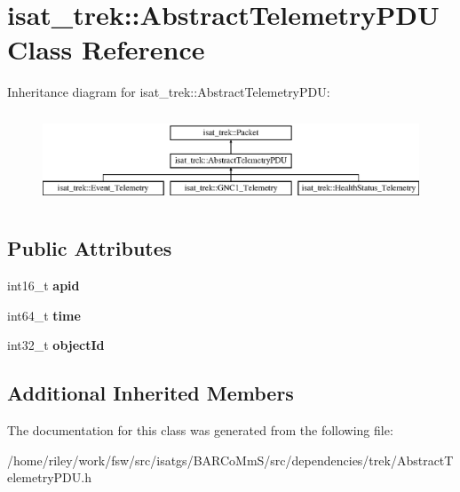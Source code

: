 \hypertarget{classisat__trek_1_1_abstract_telemetry_p_d_u}{}\section{isat\+\_\+trek\+:\+:Abstract\+Telemetry\+P\+DU Class Reference}
\label{classisat__trek_1_1_abstract_telemetry_p_d_u}
Inheritance diagram for isat\+\_\+trek\+:\+:Abstract\+Telemetry\+P\+DU\+:\begin{figure}[H]
\begin{center}
\leavevmode
\includegraphics[height=2.731707cm]{classisat__trek_1_1_abstract_telemetry_p_d_u}
\end{center}
\end{figure}
\subsection*{Public Attributes}
\begin{DoxyCompactItemize}
\item 
int16\+\_\+t {\bfseries apid}\hypertarget{classisat__trek_1_1_abstract_telemetry_p_d_u_a8d68fb30bcce86339235a3a14b72f041}{}\label{classisat__trek_1_1_abstract_telemetry_p_d_u_a8d68fb30bcce86339235a3a14b72f041}

\item 
int64\+\_\+t {\bfseries time}\hypertarget{classisat__trek_1_1_abstract_telemetry_p_d_u_affa9a64e7a5f63f83ce6d81f3e8e525f}{}\label{classisat__trek_1_1_abstract_telemetry_p_d_u_affa9a64e7a5f63f83ce6d81f3e8e525f}

\item 
int32\+\_\+t {\bfseries object\+Id}\hypertarget{classisat__trek_1_1_abstract_telemetry_p_d_u_a4cc65c6b3adf09479794bb66ba71da22}{}\label{classisat__trek_1_1_abstract_telemetry_p_d_u_a4cc65c6b3adf09479794bb66ba71da22}

\end{DoxyCompactItemize}
\subsection*{Additional Inherited Members}


The documentation for this class was generated from the following file\+:\begin{DoxyCompactItemize}
\item 
/home/riley/work/fsw/src/isatgs/\+B\+A\+R\+Co\+Mm\+S/src/dependencies/trek/Abstract\+Telemetry\+P\+D\+U.\+h\end{DoxyCompactItemize}
